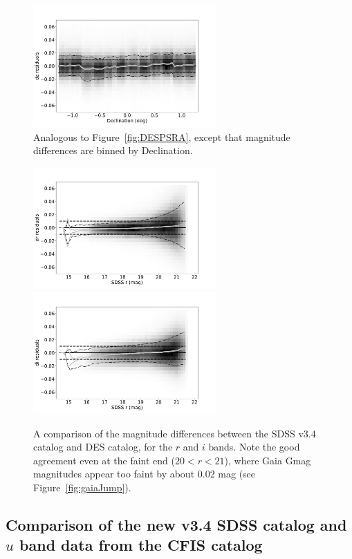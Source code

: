 \begin{figure}[th!]
    \centering\includegraphics[width=7cm]{figures/colorResidPSDR2bright_dz_Dec_Hess.png}
\caption{Analogous to Figure~\ref{fig:DESPSRA}, except that magnitude differences
are binned by Declination.}
\label{fig:DESPSDec}
\end{figure}

\begin{figure}[th!]
    \centering\includegraphics[width=7cm]{figures/colorResidDES2_dr_rmag_Hess.png}
    \centering\includegraphics[width=7cm]{figures/colorResidDES2_di_rmag_Hess.png} 
\caption{A comparison of the magnitude differences between the SDSS v3.4 catalog
and DES catalog, for the $r$ and $i$ bands. Note the good agreement even at the
faint end ($20<r<21$), where Gaia Gmag magnitudes appear too faint by about
0.02 mag (see Figure~\ref{fig:gaiaJump}).} 
\label{fig:drVSr}
\end{figure}



\subsection{Comparison of the new v3.4 SDSS catalog and $u$ band data from the CFIS catalog  \label{sec:CFIStest}} 

